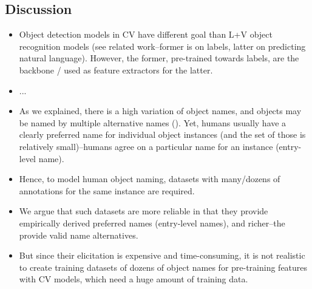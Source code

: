 \subsection{Discussion}
\label{sect:exp_discussion}

{}
\begin{itemize}
	\item Object detection models in CV have different goal than L+V object recognition models (see related work--former is on labels, latter on predicting natural language). 
	However, the former, pre-trained towards labels, are the backbone / used as feature extractors for the latter.
	\item ... 
	\item As we explained, there is a high variation of object names, and objects may be named by multiple alternative names (). 
	Yet, humans usually have a clearly preferred name for individual object instances (and the set of those is relatively small)--humans agree on a particular name for an instance (entry-level name).
	\item Hence, to model human object naming, datasets with many/dozens of annotations for the same instance are required. 
	\item We argue that such datasets are more reliable in that they provide empirically derived preferred names (entry-level names), and richer--the provide valid name alternatives. 
	\item But since their elicitation is expensive and time-consuming, it is not realistic to create training datasets of dozens of object names for pre-training features with CV models, which need a huge amount of training data. 
\end{itemize}

